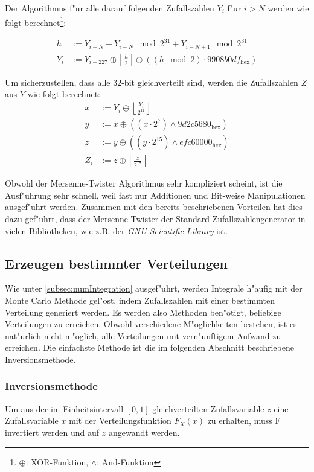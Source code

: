 \begin{refsection}
Der Algorithmus f"ur alle darauf folgenden Zufallszahlen $Y_i$ f"ur
$i>N$ werden wie folgt berechnet\footnote{$\oplus$: XOR-Funktion,
$\wedge$: And-Funktion}:

\begin{align}
	h &:=  Y_{i-N} - Y_{i-N} \mod{2^{31}} + Y_{i-N+1} \mod{2^{31}} \\
	Y_i &:= Y_{i-227} \oplus \left\lfloor \frac{h}{2} \right\rfloor \oplus \left( \left(h \mod{2} \right) \cdot 9908b0df_{\text{hex}}\right)
\end{align}

Um sicherzustellen, dass alle 32-bit gleichverteilt sind, werden die
Zufallszahlen $Z$ aus $Y$ wie folgt berechnet:
\begin{align}
	x &:= Y_{i} \oplus \left\lfloor \frac{Y_i}{2^{11}} \right\rfloor \\
	y &:= x \oplus \left(\left(x \cdot 2^7\right) \wedge 9d2c5680_{\text{hex}} \right) \\
	z &:= y \oplus \left(\left(y \cdot 2^{15}\right) \wedge efc60000_{\text{hex}} \right) \\
	Z_i &:= z \oplus \left\lfloor \frac{z}{2^{18}} \right\rfloor
\end{align}

Obwohl der Mersenne-Twister Algorithmus sehr kompliziert scheint,
ist die Ausf"uhrung sehr schnell, weil fast nur Additionen und
Bit-weise Manipulationen ausgef"uhrt werden. Zusammen mit den bereits
beschriebenen Vorteilen hat dies dazu gef"uhrt, dass der Mersenne-Twister
der Standard-Zufallszahlengenerator in vielen Bibliotheken, wie z.B. der
\textit{GNU Scientific Library} ist.


\subsection{Erzeugen bestimmter Verteilungen}
Wie unter \ref{subsec:numIntegration} ausgef"uhrt, werden Integrale
h"aufig mit der Monte Carlo Methode gel"ost, indem Zufallszahlen mit einer
bestimmten Verteilung generiert werden. Es werden also Methoden ben"otigt,
beliebige Verteilungen zu erreichen. Obwohl verschiedene M"oglichkeiten
bestehen, ist es nat"urlich nicht m"oglich, alle Verteilungen mit
vern"unftigem Aufwand zu erreichen. Die einfachste Methode ist die im
folgenden Abschnitt beschriebene Inversionsmethode.

\subsubsection{Inversionsmethode}
Um aus der im Einheitsintervall $[0,1]$ gleichverteilten Zufallsvariable
$z$  eine Zufallsvariable $x$ mit der Verteilungsfunktion $F_X(x)$
zu erhalten, muss F invertiert werden und auf $z$ angewandt werden.


\end{refsection}
